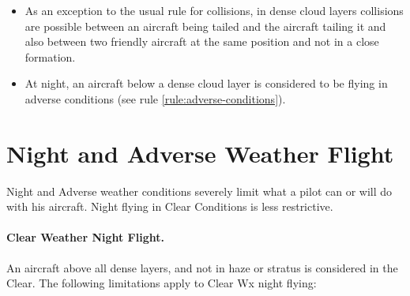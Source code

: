 \begin{advancedrules}
{\begin{itemize}
As an exception, if the target of an IRM or IR SAM enters a dense layer, the missile is allowed to follow during its next proportional move. If it cannot attack during this proportional move, it fails to track and in removed from play.

\item{} As an exception to the usual rule for collisions, in dense cloud layers collisions are possible between an aircraft being tailed and the aircraft tailing it and also between two friendly aircraft at the same position and not in a close formation.

\item{} At night, an aircraft below a dense cloud layer is considered to be flying in adverse conditions (see rule \ref{rule:adverse-conditions}).

\end{itemize}
}


\section{Night and Adverse Weather Flight}
\label{rule:night-and-adverse-weather-flight}
\label{rule:adverse-conditions}

Night and Adverse weather conditions severely limit what a pilot can or will do with his aircraft. Night flying in Clear Conditions is less restrictive.


\paragraph{Clear Weather Night Flight.} An aircraft above all dense layers, and not in haze or stratus is considered in the Clear. The following limitations apply to Clear Wx night flying:

\begin{itemize}


\end{itemize}
\end{advancedrules}
